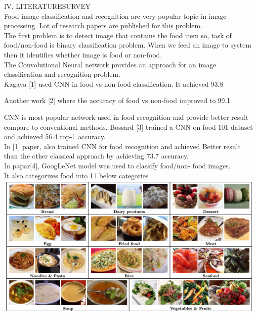 \documentclass{IEEEtran}
\begin{document}
IV. LITERATURESURVEY\\

Food image classification and recognition are very popular topic in image processing. Lot of research papers are published for this problem.\\

The first problem is to detect image that contains the food item so, task of food/non-food is binary classification problem. When we feed an image to system then it identifies whether image is food or non-food.\\

The Convolutional Neural network provides an approach for an image classification and recognition problem.\\
Kagaya [1] used CNN in food vs non-food classification.
It achieved 93.8%

Another work [2] where the accuracy of food vs non-food improved to 99.1%

CNN is most popular network used in food recognition and provide better result compare to conventional methods. Bossard [3] trained a CNN on food-101 dataset and achieved 56.4 top-1 accuracy.\\

In [1] paper, also trained CNN for food recognition and achieved Better result than the other classical approach by achieving 73.7 accuracy.\\

In papar[4], GoogLeNet model was used to classify food/non- food images.\\

It also categorizes food into 11 below categories\\

\includegraphics[scale=0.2]{food}\\
\end{document}

